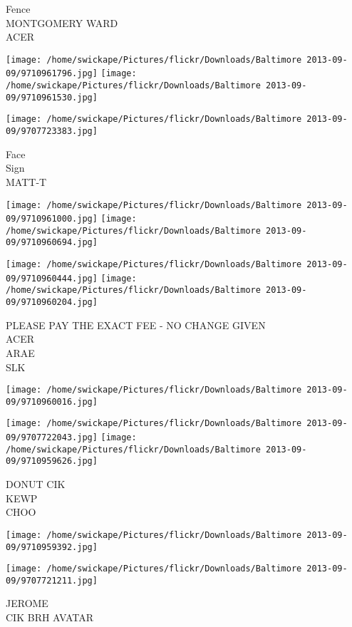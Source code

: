 \documentclass[10pt,letterpaper]{article}
\begin{document}
Fence\\
MONTGOMERY WARD\\
ACER
\pagebreak

\texttt{[image: /home/swickape/Pictures/flickr/Downloads/Baltimore 2013-09-09/9710961796.jpg]}
\texttt{[image: /home/swickape/Pictures/flickr/Downloads/Baltimore 2013-09-09/9710961530.jpg]}

\vspace{0.25in}
\texttt{[image: /home/swickape/Pictures/flickr/Downloads/Baltimore 2013-09-09/9707723383.jpg]}

Face\\
Sign\\
MATT{-}T
\pagebreak

\texttt{[image: /home/swickape/Pictures/flickr/Downloads/Baltimore 2013-09-09/9710961000.jpg]}
\texttt{[image: /home/swickape/Pictures/flickr/Downloads/Baltimore 2013-09-09/9710960694.jpg]}

\texttt{[image: /home/swickape/Pictures/flickr/Downloads/Baltimore 2013-09-09/9710960444.jpg]}
\texttt{[image: /home/swickape/Pictures/flickr/Downloads/Baltimore 2013-09-09/9710960204.jpg]}

PLEASE PAY THE EXACT FEE {-} NO CHANGE GIVEN\\
ACER\\
ARAE\\
SLK
\pagebreak

\texttt{[image: /home/swickape/Pictures/flickr/Downloads/Baltimore 2013-09-09/9710960016.jpg]}

\vspace{0.25in}
\texttt{[image: /home/swickape/Pictures/flickr/Downloads/Baltimore 2013-09-09/9707722043.jpg]}
\texttt{[image: /home/swickape/Pictures/flickr/Downloads/Baltimore 2013-09-09/9710959626.jpg]}

DONUT CIK\\
KEWP\\
CHOO
\pagebreak

\texttt{[image: /home/swickape/Pictures/flickr/Downloads/Baltimore 2013-09-09/9710959392.jpg]}

\vspace{0.25in}
\texttt{[image: /home/swickape/Pictures/flickr/Downloads/Baltimore 2013-09-09/9707721211.jpg]}

JEROME\\
CIK BRH AVATAR
\pagebreak
\end{document}
